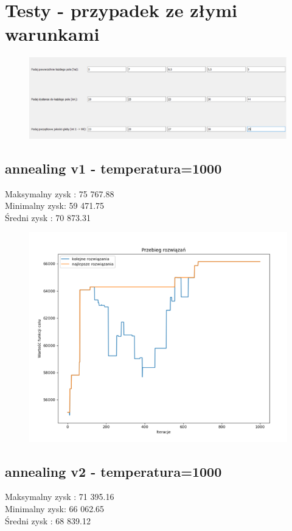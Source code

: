 \documentclass{article}
\begin{document}
\section{Testy - przypadek ze złymi warunkami}

\begin{figure}[H]
	\centering
	\includegraphics[width=0.7\linewidth]{screens/macierz_zlych_przypadkow}
	\caption{}
	\label{fig:macierzzlychprzypadkow}
\end{figure}


\subsection{annealing v1 - temperatura=1000}
Maksymalny zysk : 75 767.88\\
Minimalny zysk: 59 471.75 \\
Średni zysk : 70 873.31

\begin{figure}[H]
	\centering
	\includegraphics[width=0.7\linewidth]{screens/annealing_v1_zlych_przypadkow}
	\caption{}
	\label{fig:annealingv1zlychprzypadkow}
\end{figure}


\subsection{annealing v2 - temperatura=1000}
Maksymalny zysk : 71 395.16\\
Minimalny zysk: 66 062.65 \\
Średni zysk : 68 839.12
\end{document}
